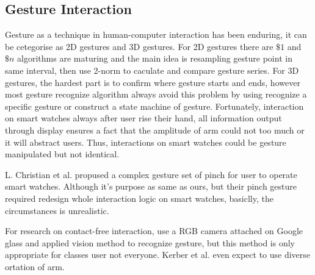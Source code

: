 \subsection{Gesture Interaction}

Gesture as a technique in human-computer interaction has been enduring, it can be cetegorise as 2D gestures and 3D gestures.
For 2D gestures there are $\$1$ \cite{wobbrock2007gestures} and $\$n$ \cite{anthony2010lightweight} algorithms are maturing and the main idea is resampling gesture point in same interval, then use 2-norm to caculate and compare gesture series.
For 3D gestures, the hardest part is to confirm where gesture starts and ends, however most gesture recognize algorithm always avoid this problem by using recognize a specific gesture or construct a state machine of gesture\cite{liuqingshui2002,chenyaxi2014,dihaijin2011,houwenjun2015,Vatavu:2014:LGT:2602299.2602316}. Fortunately, interaction on smart watches always after user rise their hand, all information output through display ensures a fact that the amplitude of arm could not too much or it will abstract users. Thus, interactions on smart watches could be gesture manipulated but not identical.

L. Christian et al. \cite{loclair2010pinchwatch} propused a complex gesture set of pinch for user to operate smart watches. Although it's purpose as same as ours, but their pinch gesture required redesign whole interaction logic on smart watches, basiclly, the circumstances is unrealistic.

For research on contact-free interaction, \cite{lv2015extending} use a RGB camera attached on Google glass and applied vision method to recognize gesture, but this method is only appropriate for classes user not everyone.
Kerber et al. \cite{Kerber:2015:WPM:2836041.2836063} even expect to use diverse ortation of arm.

